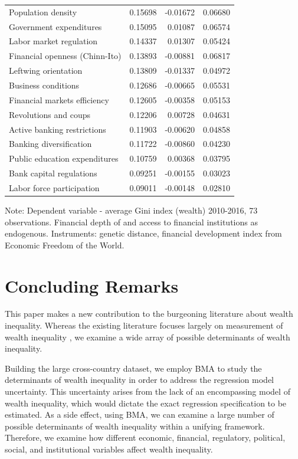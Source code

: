 \begin{refsection}
\begin{table}[!ht]
\begin{threeparttable}
\begin{tabular}{lrrr}
		Population density & 0.15698 & -0.01672 & 0.06680 \\ 
		Government expenditures & 0.15095 & 0.01087 & 0.06574 \\ 
		Labor market regulation & 0.14337 & 0.01307 & 0.05424 \\ 
		Financial openness (Chinn-Ito) & 0.13893 & -0.00881 & 0.06817 \\ 
		Leftwing orientation & 0.13809 & -0.01337 & 0.04972 \\ 
		Business conditions & 0.12686 & -0.00665 & 0.05531 \\ 
		Financial markets efficiency & 0.12605 & -0.00358 & 0.05153 \\ 
		Revolutions and coups & 0.12206 & 0.00728 & 0.04631 \\ 
		Active banking restrictions & 0.11903 & -0.00620 & 0.04858 \\ 
		Banking diversification & 0.11722 & -0.00860 & 0.04230 \\ 
		Public education expenditures & 0.10759 & 0.00368 & 0.03795 \\ 
		Bank capital regulations & 0.09251 & -0.00155 & 0.03023 \\ 
		Labor force participation & 0.09011 & -0.00148 & 0.02810 \\ 
		\bottomrule
	\end{tabular}
\begin{tablenotes}
\item Note: Dependent variable - average Gini index (wealth) 2010-2016, 73 observations. Financial depth of and access to financial institutions as endogenous. Instruments: genetic distance, financial development index from Economic Freedom of the World.
\end{tablenotes}
\end{threeparttable}
\end{table}
%
%
%
%
%
\section{Concluding Remarks}
\label{ch3sec:conclusion}

This paper makes a new contribution to the burgeoning literature about wealth inequality. Whereas the existing literature focuses largely on measurement of wealth inequality \parencite{alvaredoetal2013,daviesetal2011,pikettyandzucman2014,SaezZucman2016}, we examine a wide array of possible determinants of wealth inequality. 

Building the large cross-country dataset, we employ \ac{BMA} to study the determinants of wealth inequality in order to address the regression model uncertainty. This uncertainty arises from the lack of an encompassing model of wealth inequality, which would dictate the exact regression specification to be estimated. As a side effect, using \ac{BMA}, we can examine a large number of possible determinants of wealth inequality within a unifying framework. Therefore, we examine how different economic, financial, regulatory, political, social, and institutional variables affect wealth inequality.  


\end{refsection}
